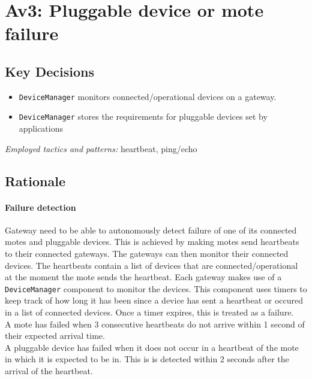 \section{Av3: Pluggable device or mote failure}
    \subsection*{Key Decisions}
    \begin{itemize}
    	\item \texttt{DeviceManager} monitors connected/operational devices on a gateway.
    	\item \texttt{DeviceManager} stores the requirements for pluggable devices set by applications
    \end{itemize}
    \emph{Employed tactics and patterns:} heartbeat, ping/echo

    \subsection*{Rationale}
        \paragraph{Failure detection}
            Gateway need to be able to autonomously detect failure of one of its
            connected motes and pluggable devices. This is achieved by making motes
            send heartbeats to their connected gateways. The gateways can
            then monitor their connected devices. The heartbeats contain a list
            of devices that are connected/operational at the moment the mote sends
            the heartbeat. Each gateway makes use of a \texttt{DeviceManager}
            component to monitor the devices. This component uses timers to keep track
            of how long it has been since a device has sent a heartbeat or occured in
            a list of connected devices. Once a timer expires, this is treated as
            a failure. \\

            A mote has failed when 3 consecutive heartbeats do not arrive within 1
            second of their expected arrival time. \\
            A pluggable device has failed when it does not occur in a heartbeat of the
            mote in which it is expected to be in. This is is detected within 2
            seconds after the arrival of the heartbeat.
            
